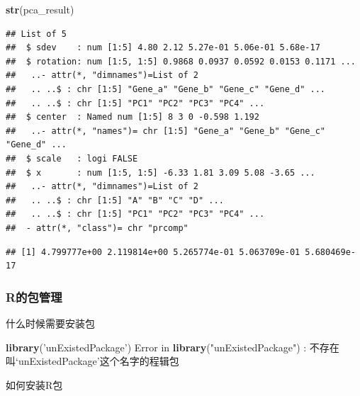 \documentclass[]{article}
\newenvironment{Shaded}{\begin{snugshade}}{\end{snugshade}}
\newcommand{\KeywordTok}[1]{\textcolor[rgb]{0.13,0.29,0.53}{\textbf{{#1}}}}
\newcommand{\StringTok}[1]{\textcolor[rgb]{0.31,0.60,0.02}{{#1}}}
\newcommand{\CommentTok}[1]{\textcolor[rgb]{0.56,0.35,0.01}{\textit{{#1}}}}
\newcommand{\NormalTok}[1]{{#1}}
\numberwithin{figure}{section}
\numberwithin{table}{section}
\theoremstyle{definition}
\theoremstyle{definition}
\theoremstyle{definition}
\theoremstyle{remark}
\begin{document}
\begin{Shaded}
\begin{Highlighting}[]
\KeywordTok{str}\NormalTok{(pca_result)}
\end{Highlighting}
\end{Shaded}

\begin{verbatim}
## List of 5
##  $ sdev    : num [1:5] 4.80 2.12 5.27e-01 5.06e-01 5.68e-17
##  $ rotation: num [1:5, 1:5] 0.9868 0.0937 0.0592 0.0153 0.1171 ...
##   ..- attr(*, "dimnames")=List of 2
##   .. ..$ : chr [1:5] "Gene_a" "Gene_b" "Gene_c" "Gene_d" ...
##   .. ..$ : chr [1:5] "PC1" "PC2" "PC3" "PC4" ...
##  $ center  : Named num [1:5] 8 3 0 -0.598 1.192
##   ..- attr(*, "names")= chr [1:5] "Gene_a" "Gene_b" "Gene_c" "Gene_d" ...
##  $ scale   : logi FALSE
##  $ x       : num [1:5, 1:5] -6.33 1.81 3.09 5.08 -3.65 ...
##   ..- attr(*, "dimnames")=List of 2
##   .. ..$ : chr [1:5] "A" "B" "C" "D" ...
##   .. ..$ : chr [1:5] "PC1" "PC2" "PC3" "PC4" ...
##  - attr(*, "class")= chr "prcomp"
\end{verbatim}

\begin{Shaded}
\end{Shaded}

\begin{verbatim}
## [1] 4.799777e+00 2.119814e+00 5.265774e-01 5.063709e-01 5.680469e-17
\end{verbatim}

\subsubsection{R的包管理}\label{r}

什么时候需要安装包

\begin{Shaded}
\begin{Highlighting}[]
\KeywordTok{library}\NormalTok{(}\StringTok{'unExistedPackage'}\NormalTok{)}
\NormalTok{Error in }\KeywordTok{library}\NormalTok{(}\StringTok{"unExistedPackage"}\NormalTok{) :}\StringTok{ }
\StringTok{  }\NormalTok{不存在叫‘unExistedPackage’这个名字的程辑包}
\end{Highlighting}
\end{Shaded}

如何安装R包
\end{document}
